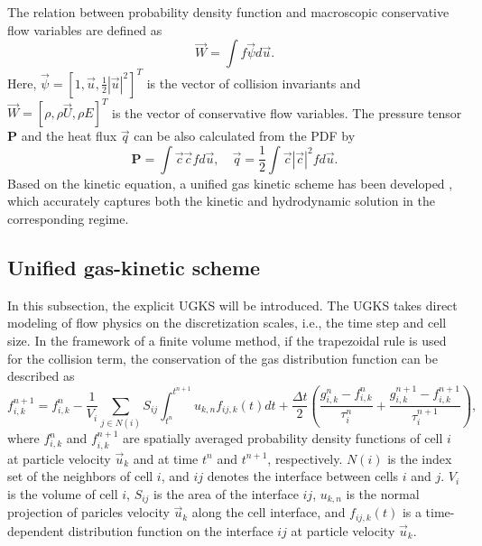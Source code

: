 \documentclass[3p,12pt]{elsarticle}
\begin{document}
	The relation between probability density function and macroscopic conservative flow variables are defined as
	\begin{equation}
		\vec{W} = \int f\vec{\psi} d\vec{u}.
		\label{moments}\end{equation}
	Here, $\vec{\psi} = \left[ 1, \vec{u}, \frac{1}{2}|\vec{u}|^2\right]^{T}$ is the vector of collision invariants and $\vec{W} = \left[\rho, \rho \vec{U}, \rho E \right]^T$ is the vector of conservative flow variables. The pressure tensor $\mathbf{P}$ and the heat flux $\vec{q}$ can be also calculated from the PDF by
	\begin{equation}
			\mathbf{P} = \int \vec{c} \vec{c} f d\vec{u}, \quad
			\vec{q} = \frac{1}{2} \int \vec{c} |\vec{c}|^2f d\vec{u}.
	\end{equation}
	Based on the kinetic equation, a unified gas kinetic scheme has been developed \cite{xu2010unified}, which accurately captures both the kinetic and hydrodynamic solution in the corresponding regime.
	\subsection{Unified gas-kinetic scheme}
	In this subsection, the explicit UGKS will be introduced.
	The UGKS takes direct modeling of flow physics on the discretization scales, i.e., the time step and cell size.
	In the framework of a finite volume method, if the trapezoidal rule is used for the collision term, the conservation of the gas distribution function can be described as
	\begin{equation}
		f_{i,k}^{n+1} = f_{i,k}^n - \frac{1}{V_i} \sum _{j \in N(i)} S_{ij} \int_{t^n}^{t^{n+1}} u_{k,n}f_{ij,k}(t) dt + \frac{\Delta t}{2} \left( \frac{g_{i,k}^n - f_{i,k}^n}{\tau^n_i} + \frac{g_{i,k}^{n+1} - f_{i,k}^{n+1}}{\tau^{n+1}_i} \right),
		\label{Discre}\end{equation}
	where $f_{i,k}^{n}$ and $f_{i,k}^{n+1}$ are spatially averaged probability density functions of cell $i$ at particle velocity $\vec{u}_k$ and at time $t^n$ and $t^{n+1}$, respectively. $N(i)$ is the index set of the neighbors of cell $i$, and $ij$ denotes the interface between cells $i$ and $j$. $V_i$ is the volume of cell $i$, $S_{ij}$ is the area of the interface $ij$, $u_{k,n}$ is the normal projection of paricles velocity $\vec{u}_k$ along the cell interface, and $f_{ij,k}(t)$ is a time-dependent distribution function on the interface $ij$ at particle velocity $\vec{u}_k$.
	
\end{document}

